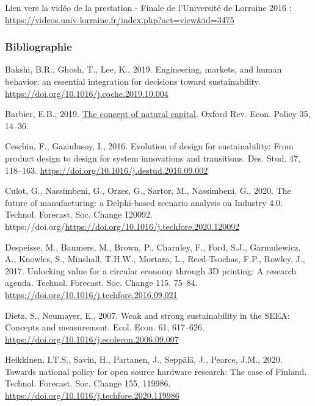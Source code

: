 \documentclass[
  11pt,
]{article}
\newlength{\cslhangindent}
\newlength{\cslentryspacingunit} %
\newenvironment{CSLReferences}[2] %
 {%
  \setlength{\parindent}{0pt}
  \ifodd #1
  \let\oldpar\par
  \def\par{\hangindent=\cslhangindent\oldpar}
  \fi
  \setlength{\parskip}{#2\cslentryspacingunit}
 }%
 {}
\begin{document}
Lien vers la vidéo de la prestation - Finale de l'Université de Lorraine
2016 : \url{https://videos.univ-lorraine.fr/index.php?act=view&id=3475}

\newpage

\hypertarget{bibliographie}{%
\subsubsection{Bibliographie}\label{bibliographie}}

\hypertarget{refs}{}
\begin{CSLReferences}{1}{0}
\leavevmode{}%
Bakshi, B.R., Ghosh, T., Lee, K., 2019. {Engineering, markets, and human
behavior: an essential integration for decisions toward sustainability}.
\url{https://doi.org/10.1016/j.coche.2019.10.004}

\leavevmode{}%
Barbier, E.B., 2019.
\href{https://academic.oup.com/oxrep/article/35/1/14/5267896}{{The
concept of natural capital}}. Oxford Rev. Econ. Policy 35, 14--36.

\leavevmode{}%
Ceschin, F., Gaziulusoy, I., 2016. {Evolution of design for
sustainability: From product design to design for system innovations and
transitions}. Des. Stud. 47, 118--163.
\url{https://doi.org/10.1016/j.destud.2016.09.002}

\leavevmode{}%
Culot, G., Nassimbeni, G., Orzes, G., Sartor, M., Nassimbeni, G., 2020.
{The future of manufacturing: a Delphi-based scenario analysis on
Industry 4.0}. Technol. Forecast. Soc. Change 120092.
https://doi.org/\url{https://doi.org/10.1016/j.techfore.2020.120092}

\leavevmode{}%
Despeisse, M., Baumers, M., Brown, P., Charnley, F., Ford, S.J.,
Garmulewicz, A., Knowles, S., Minshall, T.H.W., Mortara, L.,
Reed-Tsochas, F.P., Rowley, J., 2017. {Unlocking value for a circular
economy through 3D printing: A research agenda}. Technol. Forecast. Soc.
Change 115, 75--84. \url{https://doi.org/10.1016/j.techfore.2016.09.021}

\leavevmode{}%
Dietz, S., Neumayer, E., 2007. {Weak and strong sustainability in the
SEEA: Concepts and measurement}. Ecol. Econ. 61, 617--626.
\url{https://doi.org/10.1016/j.ecolecon.2006.09.007}

\leavevmode{}%
Heikkinen, I.T.S., Savin, H., Partanen, J., Seppälä, J., Pearce, J.M.,
2020. {Towards national policy for open source hardware research: The
case of Finland}. Technol. Forecast. Soc. Change 155, 119986.
\url{https://doi.org/10.1016/j.techfore.2020.119986}


\end{CSLReferences}
\end{document}
